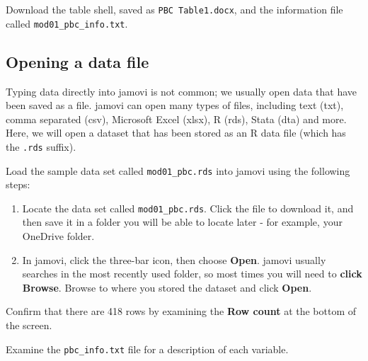 \documentclass[
  a4paper,
]{memoir}
\begin{document}
\begin{tcolorbox}[enhanced jigsaw, arc=.35mm, bottomrule=.15mm, bottomtitle=1mm, breakable, colback=white, colbacktitle=quarto-callout-note-color!10!white, colframe=quarto-callout-note-color-frame, coltitle=black, left=2mm, leftrule=.75mm, opacityback=0, opacitybacktitle=0.6, rightrule=.15mm, title={TASK}, titlerule=0mm, toprule=.15mm, toptitle=1mm]

Download the table shell, saved as \texttt{PBC\ Table1.docx}, and the
information file called \texttt{mod01\_pbc\_info.txt}.

\end{tcolorbox}

\subsection{Opening a data file}\label{opening-a-data-file}

Typing data directly into jamovi is not common; we usually open data
that have been saved as a file. jamovi can open many types of files,
including text (txt), comma separated (csv), Microsoft Excel (xlsx), R
(rds), Stata (dta) and more. Here, we will open a dataset that has been
stored as an R data file (which has the \texttt{.rds} suffix).

\begin{tcolorbox}[enhanced jigsaw, arc=.35mm, bottomrule=.15mm, bottomtitle=1mm, breakable, colback=white, colbacktitle=quarto-callout-note-color!10!white, colframe=quarto-callout-note-color-frame, coltitle=black, left=2mm, leftrule=.75mm, opacityback=0, opacitybacktitle=0.6, rightrule=.15mm, title={TASK}, titlerule=0mm, toprule=.15mm, toptitle=1mm]

Load the sample data set called \texttt{mod01\_pbc.rds} into jamovi
using the following steps:

\begin{enumerate}
\def\labelenumi{\arabic{enumi}.}
\item
  Locate the data set called \texttt{mod01\_pbc.rds}. Click the file to
  download it, and then save it in a folder you will be able to locate
  later - for example, your OneDrive folder.
\item
  In jamovi, click the three-bar icon, then choose \textbf{Open}. jamovi
  usually searches in the most recently used folder, so most times you
  will need to \textbf{click Browse}. Browse to where you stored the
  dataset and click \textbf{Open}.
\end{enumerate}

Confirm that there are 418 rows by examining the \textbf{Row count} at
the bottom of the screen.

Examine the \texttt{pbc\_info.txt} file for a description of each
variable.

\end{tcolorbox}
\end{document}
